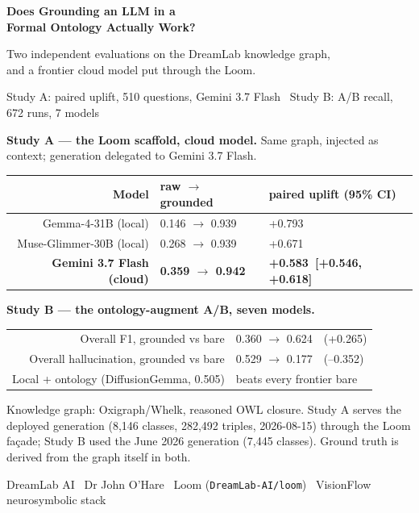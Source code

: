 \documentclass[11pt]{article}
\newcommand{\up}[1]{\textcolor{burnt}{+#1}}
\newcommand{\down}[1]{\textcolor{teal0}{--#1}}
\begin{document}
\begin{titlepage}
\centering\vspace*{1.4cm}
{\color{teal0}\Huge\bfseries Does Grounding an LLM in a\\[4pt] Formal Ontology Actually Work?\par}
\vspace{0.5cm}
{\large Two independent evaluations on the DreamLab knowledge graph,\\[2pt]
and a frontier cloud model put through the Loom.\par}
\vspace{0.3cm}
{\color{burnt}\large Study A: paired uplift, 510 questions, Gemini 3.7 Flash \textbullet\
Study B: A/B recall, 672 runs, 7 models\par}
\vspace{1.1cm}

{\bfseries\color{teal0}Study A --- the Loom scaffold, cloud model.} Same graph, injected as
context; generation delegated to Gemini 3.7 Flash.
\begin{tabular}{rll}
\toprule
\textbf{Model} & \textbf{raw $\to$ grounded} & \textbf{paired uplift (95\% CI)} \\
\midrule
Gemma-4-31B (local) & 0.146 $\to$ 0.939 & \up{0.793} \\
Muse-Glimmer-30B (local) & 0.268 $\to$ 0.939 & \up{0.671} \\
\textbf{Gemini 3.7 Flash (cloud)} & \textbf{0.359 $\to$ 0.942} & \textbf{\up{0.583}\ [+0.546, +0.618]} \\
\bottomrule
\end{tabular}

\vspace{0.5cm}
{\bfseries\color{teal0}Study B --- the ontology-augment A/B, seven models.}
\begin{tabular}{rl}
\toprule
Overall F1, grounded vs bare & 0.360 $\to$ 0.624\ \ (\up{0.265}) \\
Overall hallucination, grounded vs bare & 0.529 $\to$ 0.177\ \ (\down{0.352}) \\
Local + ontology (DiffusionGemma, 0.505) & beats every frontier bare \\
\bottomrule
\end{tabular}

\vfill
{\small Knowledge graph: Oxigraph/Whelk, reasoned OWL closure. Study A serves the deployed
generation (8{,}146 classes, 282{,}492 triples, 2026-08-15) through the Loom façade; Study B
used the June 2026 generation (7{,}445 classes). Ground truth is derived from the graph
itself in both.\par}
\vspace{0.5cm}
{\footnotesize\color{teal0} DreamLab AI \textbullet\ Dr John O'Hare \textbullet\
Loom (\texttt{DreamLab-AI/loom}) \textbullet\ VisionFlow neurosymbolic stack\par}
\end{titlepage}
\end{document}
